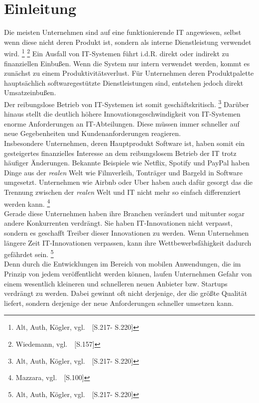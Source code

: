 \section{Einleitung}\label{einleitung}

Die meisten Unternehmen sind auf eine funktionierende IT angewiesen, selbst wenn diese nicht deren Produkt ist,
sondern als interne Dienstleistung verwendet wird. \footnote{Alt, Auth, Kögler, vgl.~\cite{Alt2017}~[S.217- S.220]} \footnote{Wiedemann, vgl.~\cite{Wiedemann2019}~[S.157]}
Ein Ausfall von IT-Systemen führt i.d.R. direkt oder indirekt zu finanziellen Einbußen.
Wenn die System nur intern verwendet werden, kommt es zunächst zu einem Produktivitätsverlust.
Für Unternehmen deren Produktpalette hauptsächlich softwaregestützte Dienstleistungen sind, entstehen jedoch direkt Umsatzeinbußen. \\

Der reibungslose Betrieb von IT-Systemen ist somit geschäftskritisch. \footnote{Alt, Auth, Kögler, vgl.~\cite{Alt2017}~[S.217- S.220]}
Darüber hinaus stellt die deutlich höhere Innovationsgeschwindigkeit von IT-Systemen enorme Anforderungen an IT-Abteilungen.
Diese müssen immer schneller auf neue Gegebenheiten und Kundenanforderungen reagieren. \\

Insbesondere Unternehmen, deren Hauptprodukt Software ist, haben somit ein gesteigertes finanzielles Interesse an dem reibungslosem Betrieb der IT trotz häufiger Änderungen.
Bekannte Beispiele wie Netflix, Spotify und PayPal haben Dinge aus der \emph{realen} Welt wie Filmverleih, Tonträger und Bargeld in Software umgesetzt.
Unternehmen wie Airbnb oder Uber haben auch dafür gesorgt das die Trennung zwischen der \emph{realen} Welt und IT nicht mehr so einfach differenziert werden kann.
\footnote{Mazzara, vgl.~\cite{Mazzara2019}~[S.100]} \\

Gerade diese Unternehmen haben ihre Branchen verändert und mitunter sogar andere Konkurrenten verdrängt.
Sie haben IT-Innovationen nicht verpasst, sondern es geschafft Treiber dieser Innovationen zu werden.
Wenn Unternehmen längere Zeit IT-Innovationen verpassen, kann ihre Wettbewerbsfähigkeit dadurch gefährdet sein. \footnote{Alt, Auth, Kögler, vgl.~\cite{Alt2017}~[S.217- S.220]} \\

Denn durch die Entwicklungen im Bereich von mobilen Anwendungen, die im Prinzip von jedem veröffentlicht werden können,
laufen Unternehmen Gefahr von einem wesentlich kleineren und schnelleren neuen Anbieter bzw. Startups verdrängt zu werden.
Dabei gewinnt oft nicht derjenige, der die größte Qualität liefert, sondern derjenige der neue Anforderungen schneller umsetzen kann. \\

